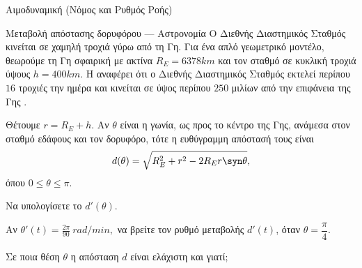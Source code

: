 \begin{problhma}{Αιμοδυναμική (Νόμος  και Ρυθμός Ροής)}
\begin{center}
\end{center}
\end{problhma}

\begin{problhma}{Μεταβολή απόστασης δορυφόρου --- Αστρονομία}
Ο Διεθνής Διαστημικός Σταθμός κινείται σε χαμηλή τροχιά γύρω από τη Γη.
Για ένα απλό γεωμετρικό μοντέλο, θεωρούμε τη Γη σφαιρική με ακτίνα
\(R_E=6378\si{km}\) και τον σταθμό σε κυκλική τροχιά ύψους
\(h=400\si{km}\). Η  αναφέρει ότι ο Διεθνής Διαστημικός Σταθμός
εκτελεί περίπου \(16\) τροχιές την ημέρα και κινείται σε ύψος περίπου
\(250\) μιλίων από την επιφάνεια της Γης
\cite{nasaEarthFacts,nasaSpotTheStation}.

Θέτουμε \(r=R_E+h\). Αν \(\theta\) είναι η γωνία, ως προς το κέντρο της
Γης, ανάμεσα στον σταθμό εδάφους και τον δορυφόρο, τότε η ευθύγραμμη
απόστασή τους είναι
\[
  d(\theta) = \sqrt{R_E^2 + r^2 - 2R_E r\syn\theta},
\]
όπου \(0\leq\theta\leq\pi\).
\begin{alist}
  \item Να υπολογίσετε το \(d'(\theta)\).
  \item Αν $\theta'(t)=\frac{2\pi}{90}\ \si{rad/min},$
        να βρείτε τον ρυθμό μεταβολής \(d'(t)\), όταν
        \(\theta=\dfrac{\pi}{4}\).
  \item Σε ποια θέση \(\theta\) η απόσταση \(d\) είναι ελάχιστη και γιατί;
\end{alist}

\begin{center}
\end{center}
\end{problhma}
